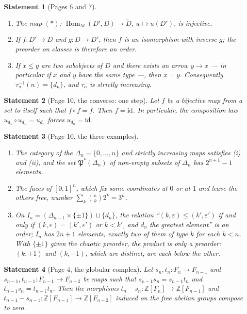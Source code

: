 \documentclass[11pt]{article}
\newcommand{\q}[1]{“#1”}
\theoremstyle{plain}
\newtheorem*{enonce}{Statement}
\theoremstyle{definition}
\theoremstyle{remark}
\begin{document}
\begin{enonce}[Pages 6 and 7]
\begin{enumerate}
\item The map $(*)$: $\operatorname{Hom}_M(D', D) \to \widetilde D$, $u \mapsto u(D')$, is injective.
\item If $f : D' \to D$ and $g : D \to D'$, then $f$ is an isomorphism with inverse $g$; the preorder on classes is therefore an order.
\item If $x \leq y$ are two subobjects of $D$ and there exists an arrow $y \to x$ --- in particular if $x$ and $y$ have the same type ---, then $x = y$. Consequently $\tau_n^{-1}(n) = \{d_n\}$, and $\tau_n$ is strictly increasing.
\end{enumerate}
\end{enonce}

\begin{enonce}[Page 10, the converse: one step]
Let $f$ be a bijective map from a set to itself such that $f \circ f = f$. Then $f = \mathrm{id}$. In particular, the composition law $u_{d_n} \circ u_{d_n} = u_{d_n}$ forces $u_{d_n} = \mathrm{id}$.
\end{enonce}

\begin{enonce}[Page 10, the three examples]
\begin{enumerate}
\item The category of the $\Delta_n = \{0, \dots, n\}$ and strictly increasing maps satisfies (i) and (ii), and the set $\mathfrak P^*(\Delta_n)$ of non-empty subsets of $\Delta_n$ has $2^{n+1} - 1$ elements.
\item The faces of $[0,1]^n$, which fix some coordinates at $0$ or at $1$ and leave the others free, number $\sum_{k} \binom nk 2^k = 3^n$.
\item On $I_n = (\Delta_{n-1} \times \{\pm 1\}) \sqcup \{d_n\}$, the relation \q{$(k, \varepsilon) \leq (k', \varepsilon')$ if and only if $(k, \varepsilon) = (k', \varepsilon')$ or $k < k'$, and $d_n$ the greatest element} is an order; $I_n$ has $2n + 1$ elements, exactly two of them of type $k$ for each $k < n$. With $\{\pm 1\}$ given the chaotic preorder, the product is only a preorder: $(k, +1)$ and $(k, -1)$, which are distinct, are each below the other.
\end{enumerate}
\end{enonce}

\begin{enonce}[Page 4, the globular complex]
Let $s_n, t_n : F_n \to F_{n-1}$ and $s_{n-1}, t_{n-1} : F_{n-1} \to F_{n-2}$ be maps such that $s_{n-1}s_n = s_{n-1}t_n$ and $t_{n-1}s_n = t_{n-1}t_n$. Then the morphisms $t_n - s_n : \mathbb Z[F_n] \to \mathbb Z[F_{n-1}]$ and $t_{n-1} - s_{n-1} : \mathbb Z[F_{n-1}] \to \mathbb Z[F_{n-2}]$ induced on the free abelian groups compose to zero.
\end{enonce}
\end{document}
